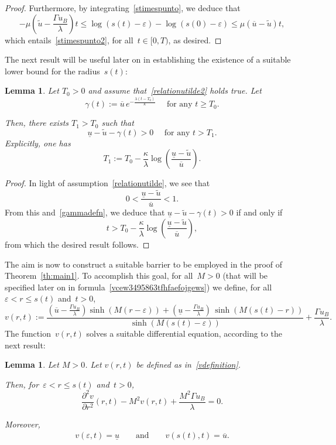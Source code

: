 \documentclass[12pt,a4paper,intlimits,sumlimits]{amsart}
\theoremstyle{definition}
\theoremstyle{plain}
\newtheorem{lemma}[definition]{Lemma}
\numberwithin{equation}{section}
\renewcommand{\leq}{\leqslant}
\renewcommand{\le}{\leqslant}
\renewcommand{\ge}{\geqslant}
\begin{document}
\begin{proof}
Furthermore, by integrating~\eqref{stimespunto},  we deduce that
\[
-\mu\left(\widetilde u-\frac{\Gamma u_B}{\lambda}\right) t\leq \log(s(t)-\varepsilon)-\log(s(0)-\varepsilon)\leq \mu(\overline{u}-\widetilde u) t,
\]
which entails~\eqref{stimespunto2}, for all~$t\in[0,T)$, as desired.
\end{proof}

The next result will be useful later on in establishing the existence of a suitable lower bound for the radius~$s(t)$:

\begin{lemma}\label{lemmaT1}
Let $T_0>0$ and assume that~\eqref{relationutilde2} holds true. Let
\begin{equation}\label{gammadefn}
\gamma(t):=\overline{u}\, e^{-\frac{\lambda(t-T_0)}{\kappa}} \quad\mbox{ for any } t\ge T_0.
\end{equation}

Then, there exists $T_1>T_0$ such that
\[
\underline{u}-\widetilde u -\gamma(t)>0 \quad\mbox{ for any } t> T_1.
\]
Explicitly, one has
\[
T_1:= T_0 -\frac{\kappa}{\lambda}\log\left(\frac{\underline{u} -\widetilde u}{\overline{u}}\right).
\]
\end{lemma}

\begin{proof}
In light of assumption~\eqref{relationutilde}, we see that
\[
0<\frac{\underline{u} -\widetilde u}{\overline{u}}<1.
\]
From this and~\eqref{gammadefn}, we deduce that $\underline{u}-\widetilde u -\gamma(t)>0$ if and only if
\[
t>T_0 -\frac{\kappa}{\lambda}\log\left(\frac{\underline{u} -\widetilde u}{\overline{u}}\right),
\] from which the desired result follows.
\end{proof}

The aim is now to construct a suitable barrier to be employed in the proof of Theorem~\ref{th:main1}. To accomplish this goal, for all~$M>0$ (that will be specified later on in formula~\eqref{vcew3495863tfhfaefojgews}) we define,
for all~$\varepsilon <r\le s(t)$ and~$t>0$,
\begin{equation}\label{vdefinition}
v(r, t):= \frac{\left(\overline{u}-\frac{\Gamma u_B}{\lambda}\right)\sinh(M(r-\varepsilon)) +\left(\underline{u}-\frac{\Gamma u_B}{\lambda}\right)\,\sinh(M(s(t)-r))}{\sinh(M(s(t)-\varepsilon))}+\frac{\Gamma u_B}{\lambda}.
\end{equation}
The function~$v(r, t)$ solves a suitable differential equation, according to the next result:

\begin{lemma}\label{lemmasoluzionev}
Let $M>0$. Let $v(r, t)$ be defined as in~\eqref{vdefinition}.

Then, for~$\varepsilon<r\le s(t)$ and~$t>0$,
\[
\frac{\partial^2v}{\partial r^2}(r, t) - M^2 v(r, t)+\frac{M^2\Gamma u_B}{\lambda}=0.
\]

Moreover,
\begin{eqnarray*}
v(\varepsilon, t)=\underline u
\qquad{\mbox{and}}\qquad v(s(t),t)=\overline u.
\end{eqnarray*}
\end{lemma}
\end{document}
